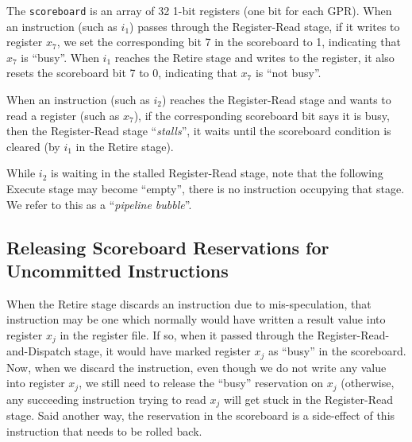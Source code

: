 The \verb|scoreboard| is an array of 32 1-bit registers (one bit for
each GPR).  When an instruction (such as $i_1$) passes through the
Register-Read stage, if it writes to register $x_7$, we set the
corresponding bit 7 in the scoreboard to 1, indicating that $x_7$ is
``busy''.  When $i_1$ reaches the Retire stage and writes to the
register, it also resets the scoreboard bit 7 to 0, indicating that
$x_7$ is ``not busy''.

When an instruction (such as $i_2$) reaches the Register-Read stage
and wants to read a register (such as $x_7$), if the corresponding
scoreboard bit says it is busy, then the Register-Read stage
``\emph{stalls}'', {\ie} it waits until the scoreboard condition is
cleared (by $i_1$ in the Retire stage).


While $i_2$ is waiting in the stalled Register-Read stage, note that
the following Execute stage may become ``empty'', {\ie} there is no
instruction occupying that stage.  We refer to this as a
``\emph{pipeline bubble}''.






\subsection{Releasing Scoreboard Reservations for Uncommitted Instructions}

When the Retire stage discards an instruction due to mis-speculation,
that instruction may be one which normally would have written a result
value into register $x_j$ in the register file.  If so, when it passed
through the Register-Read-and-Dispatch stage, it would have marked
register $x_j$ as ``busy'' in the scoreboard.  Now, when we discard
the instruction, even though we do not write any value into register
$x_j$, we still need to release the ``busy'' reservation on $x_j$
(otherwise, any succeeding instruction trying to read $x_j$ will get
stuck in the Register-Read stage.  Said another way, the reservation
in the scoreboard is a side-effect of this instruction that needs to
be rolled back.

